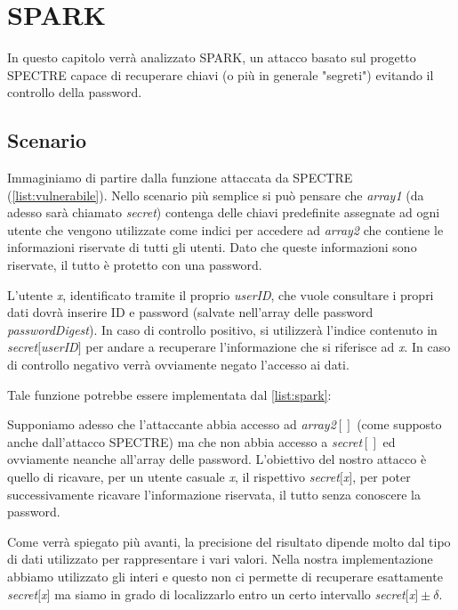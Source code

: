 \chapter{SPARK}
	In questo capitolo verrà analizzato \ac{SPARK}, un attacco basato sul progetto SPECTRE capace di recuperare chiavi (o più in generale "segreti") evitando il controllo della password.
	
	\section{Scenario}
		Immaginiamo di partire dalla funzione attaccata da SPECTRE (\cref{list:vulnerabile}). Nello scenario più semplice si può pensare che \emph{array1} (da adesso sarà chiamato \emph{secret}) contenga delle chiavi predefinite assegnate ad ogni utente che vengono utilizzate come indici  per accedere ad \emph{array2} che contiene le informazioni riservate di tutti gli utenti. Dato che queste informazioni sono riservate, il tutto è protetto con una password. 
		
		L'utente \emph{x}, identificato tramite il proprio \emph{userID}, che vuole consultare i propri dati dovrà inserire ID e password (salvate nell'array delle password \emph{passwordDigest}). In caso di controllo positivo, si utilizzerà l'indice contenuto in \emph{secret}$[$\emph{userID}$]$ per andare a recuperare l'informazione che si riferisce ad \emph{x}. In caso di controllo negativo verrà ovviamente negato l'accesso ai dati.
		
		Tale funzione potrebbe essere implementata dal \cref{list:spark}:
		
		Supponiamo adesso che l'attaccante abbia accesso ad \emph{array2}$[]$ (come supposto anche dall'attacco SPECTRE) ma che non abbia accesso a \emph{secret}$[]$ ed ovviamente neanche all'array delle password. L'obiettivo del nostro attacco è quello di ricavare, per un utente casuale \emph{x}, il rispettivo \emph{secret}$[$\emph{x}$]$, per poter successivamente ricavare l'informazione riservata, il tutto senza conoscere la password.
		
		Come verrà spiegato più avanti, la precisione del risultato dipende molto dal tipo di dati utilizzato per rappresentare i vari valori. Nella nostra implementazione abbiamo utilizzato gli interi e questo non ci permette di recuperare esattamente \emph{secret}$[$\emph{x}$]$ ma siamo in grado di localizzarlo entro un certo intervallo \emph{secret}$[$\emph{x}$] \pm \delta$.
		
		 